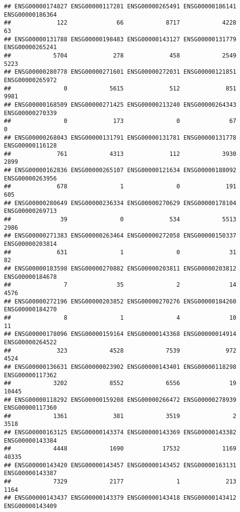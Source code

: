 \documentclass[
]{article}
\begin{document}
\begin{verbatim}
## ENSG00000174827 ENSG00000117281 ENSG00000265491 ENSG00000186141 ENSG00000186364 
##             122              66            8717            4228              63 
## ENSG00000131788 ENSG00000198483 ENSG00000143127 ENSG00000131779 ENSG00000265241 
##            5704             278             458            2549            5223 
## ENSG00000280778 ENSG00000271601 ENSG00000272031 ENSG00000121851 ENSG00000265972 
##               0            5615             512             851            9981 
## ENSG00000168509 ENSG00000271425 ENSG00000213240 ENSG00000264343 ENSG00000270339 
##               0             173               0              67               0 
## ENSG00000268043 ENSG00000131791 ENSG00000131781 ENSG00000131778 ENSG00000116128 
##             761            4313             112            3930            2899 
## ENSG00000162836 ENSG00000265107 ENSG00000121634 ENSG00000188092 ENSG00000263956 
##             678               1               0             191             605 
## ENSG00000280649 ENSG00000236334 ENSG00000270629 ENSG00000178104 ENSG00000269713 
##              39               0             534            5513            2986 
## ENSG00000271383 ENSG00000263464 ENSG00000272058 ENSG00000150337 ENSG00000203814 
##             631               1               0              31              82 
## ENSG00000183598 ENSG00000270882 ENSG00000203811 ENSG00000203812 ENSG00000184678 
##               7              35               2              14            4576 
## ENSG00000272196 ENSG00000203852 ENSG00000270276 ENSG00000184260 ENSG00000184270 
##               8               1               4              10              11 
## ENSG00000178096 ENSG00000159164 ENSG00000143368 ENSG00000014914 ENSG00000264522 
##             323            4528            7539             972            4524 
## ENSG00000136631 ENSG00000023902 ENSG00000143401 ENSG00000118298 ENSG00000117362 
##            3202            8552            6556              19           10445 
## ENSG00000118292 ENSG00000159208 ENSG00000266472 ENSG00000278939 ENSG00000117360 
##            1361             381            3519               2            3518 
## ENSG00000163125 ENSG00000143374 ENSG00000143369 ENSG00000143382 ENSG00000143384 
##            4448            1690           17532            1169           40335 
## ENSG00000143420 ENSG00000143457 ENSG00000143452 ENSG00000163131 ENSG00000143387 
##            7329            2177               1             213            1164 
## ENSG00000143437 ENSG00000143379 ENSG00000143418 ENSG00000143412 ENSG00000143409 

\end{verbatim}
\end{document}
